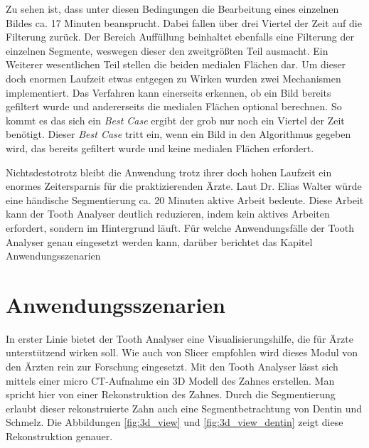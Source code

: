 Zu sehen ist, dass unter diesen Bedingungen die Bearbeitung eines einzelnen Bildes
ca. 17 Minuten beansprucht. Dabei fallen über drei Viertel der Zeit auf die Filterung
zurück. Der Bereich Auffüllung beinhaltet ebenfalls eine Filterung der einzelnen
Segmente, weswegen dieser den zweitgrößten Teil ausmacht. Ein Weiterer
wesentlichen Teil stellen die beiden medialen Flächen dar. Um dieser doch enormen
Laufzeit etwas entgegen zu Wirken wurden zwei Mechanismen implementiert. Das
Verfahren kann einerseits erkennen, ob ein Bild bereits gefiltert wurde und andererseits
die medialen Flächen optional berechnen. So kommt es das sich ein \textit{Best
Case} ergibt der grob nur noch ein Viertel der Zeit benötigt. Dieser \textit{Best
Case} tritt ein, wenn ein Bild in den Algorithmus gegeben wird, das bereits gefiltert
wurde und keine medialen Flächen erfordert.

Nichtsdestotrotz bleibt die Anwendung trotz ihrer doch hohen Laufzeit ein enormes
Zeitersparnis für die praktizierenden Ärzte. Laut Dr. Elias Walter würde eine händische
Segmentierung ca. 20 Minuten aktive Arbeit bedeute. Diese Arbeit kann der Tooth Analyser
deutlich reduzieren, indem kein aktives Arbeiten erfordert, sondern im Hintergrund
läuft. Für welche Anwendungsfälle der Tooth Analyser genau eingesetzt werden
kann, darüber berichtet das Kapitel Anwendungsszenarien

\section{Anwendungsszenarien}
In erster Linie bietet der Tooth Analyser eine Visualisierungshilfe, die für Ärzte
unterstützend wirken soll. Wie auch von Slicer empfohlen wird dieses Modul von
den Ärzten rein zur Forschung eingesetzt. Mit den Tooth Analyser lässt sich mittels
einer micro CT-Aufnahme ein 3D Modell des Zahnes erstellen. Man spricht hier von
einer Rekonstruktion des Zahnes. Durch die Segmentierung erlaubt dieser rekonstruierte
Zahn auch eine Segmentbetrachtung von Dentin und Schmelz. Die Abbildungen
\ref{fig:3d_view} und \ref{fig:3d_view_dentin} zeigt diese Rekonstruktion
genauer.


